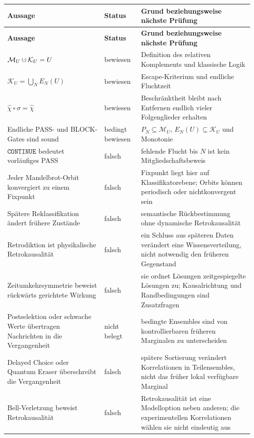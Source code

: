 \documentclass[11pt,a4paper]{article}
\theoremstyle{remark}
\newcommand{\M}{\mathcal{M}}
\newcommand{\K}{\mathcal{K}}
\newcommand{\CONTINUE}{\texttt{CONTINUE}}
\newcommand{\dotcup}{\mathbin{\mathaccent\cdot\cup}}
\begin{document}
\begin{longtable}{>{\raggedright\arraybackslash}p{}
                  >{\raggedright\arraybackslash}p{}
                  >{\raggedright\arraybackslash}p{}}
\toprule
\textbf{Aussage} & \textbf{Status} & \textbf{Grund beziehungsweise nächste Prüfung} \\
\midrule
\endfirsthead
\toprule
\textbf{Aussage} & \textbf{Status} & \textbf{Grund beziehungsweise nächste Prüfung} \\
\midrule
\endhead
\(\M_U\dotcup\K_U=U\) & bewiesen & Definition des relativen Komplements und klassische Logik \\
\(\K_U=\bigcup_NE_N(U)\) & bewiesen & Escape-Kriterium und endliche Fluchtzeit \\
\(\widehat\chi\circ\sigma=\widehat\chi\) & bewiesen & Beschränktheit bleibt nach Entfernen endlich vieler Folgenglieder erhalten \\
Endliche PASS- und BLOCK-Gates sind sound & bedingt bewiesen & \(P_N\subseteq\M_U\), \(E_N(U)\subseteq\K_U\) und Monotonie \\
\(\CONTINUE\) bedeutet vorläufiges PASS & falsch & fehlende Flucht bis \(N\) ist kein Mitgliedschaftsbeweis \\
Jeder Mandelbrot-Orbit konvergiert zu einem Fixpunkt & falsch & Fixpunkt liegt hier auf Klassifikatorebene; Orbits können periodisch oder nichtkonvergent sein \\
Spätere Reklassifikation ändert frühere Zustände & falsch & semantische Rückbestimmung ohne dynamische Retrokausalität \\
Retrodiktion ist physikalische Retrokausalität & falsch & ein Schluss aus späteren Daten verändert eine Wissensverteilung, nicht notwendig den früheren Gegenstand \\
Zeitumkehrsymmetrie beweist rückwärts gerichtete Wirkung & falsch & sie ordnet Lösungen zeitgespiegelte Lösungen zu; Kausalrichtung und Randbedingungen sind Zusatzfragen \\
Postselektion oder schwache Werte übertragen Nachrichten in die Vergangenheit & nicht belegt & bedingte Ensembles sind von kontrollierbaren früheren Marginalen zu unterscheiden \\
Delayed Choice oder Quantum Eraser überschreibt die Vergangenheit & falsch & spätere Sortierung verändert Korrelationen in Teilensembles, nicht das früher lokal verfügbare Marginal \\
Bell-Verletzung beweist Retrokausalität & falsch & Retrokausalität ist eine Modelloption neben anderen; die experimentellen Korrelationen wählen sie nicht eindeutig aus \\

\end{longtable}
\end{document}
